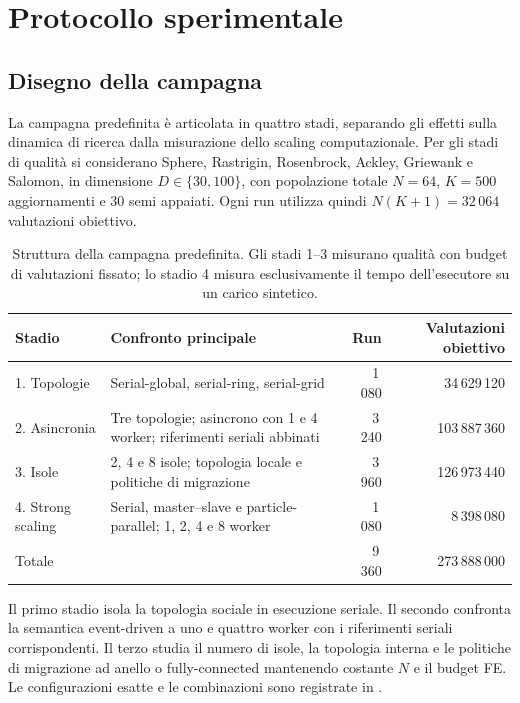 \section{Protocollo sperimentale}
\label{sec:exp}

\subsection{Disegno della campagna}

La campagna predefinita è articolata in quattro stadi, separando gli effetti sulla dinamica di ricerca dalla misurazione dello scaling computazionale. Per gli stadi di qualità si considerano Sphere, Rastrigin, Rosenbrock, Ackley, Griewank e Salomon, in dimensione $D\in\{30,100\}$, con popolazione totale $N=64$, $K=500$ aggiornamenti e 30 semi appaiati. Ogni run utilizza quindi $N(K+1)=32\,064$ valutazioni obiettivo.

\begin{table}[t]
\centering
\caption{Struttura della campagna predefinita. Gli stadi 1--3 misurano qualità con budget di valutazioni fissato; lo stadio 4 misura esclusivamente il tempo dell'esecutore su un carico sintetico.}
\label{tab:campaign-design}
\small
\begin{tabularx}{\textwidth}{@{}lXrr@{}}
\toprule
Stadio & Confronto principale & Run & Valutazioni obiettivo \\
\midrule
1. Topologie & Serial-global, serial-ring, serial-grid & 1\,080 & 34\,629\,120 \\
2. Asincronia & Tre topologie; asincrono con 1 e 4 worker; riferimenti seriali abbinati & 3\,240 & 103\,887\,360 \\
3. Isole & 2, 4 e 8 isole; topologia locale e politiche di migrazione & 3\,960 & 126\,973\,440 \\
4. Strong scaling & Serial, master--slave e particle-parallel; 1, 2, 4 e 8 worker & 1\,080 & 8\,398\,080 \\
\midrule
Totale & & 9\,360 & 273\,888\,000 \\
\bottomrule
\end{tabularx}
\end{table}

Il primo stadio isola la topologia sociale in esecuzione seriale. Il secondo confronta la semantica event-driven a uno e quattro worker con i riferimenti seriali corrispondenti. Il terzo studia il numero di isole, la topologia interna e le politiche di migrazione ad anello o fully-connected mantenendo costante $N$ e il budget FE. Le configurazioni esatte e le combinazioni sono registrate in .

